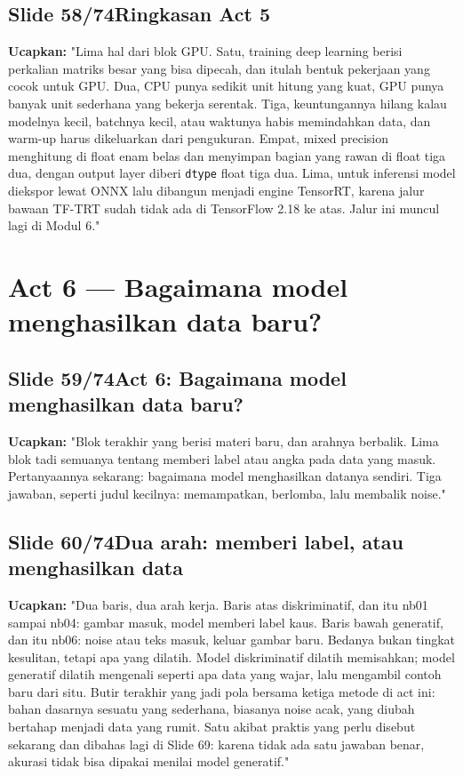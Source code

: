 \documentclass[11pt]{article}
\renewcommand{\framebox}[1]{\colorbox{acc!15}{\textcolor{acc}{\textbf{#1}}}}
\begin{document}
\subsection*{\framebox{Slide 58/74}\quad Ringkasan Act 5}
\textbf{Ucapkan:} "Lima hal dari blok GPU. Satu, training deep learning berisi perkalian matriks besar yang bisa dipecah, dan itulah bentuk pekerjaan yang cocok untuk GPU. Dua, CPU punya sedikit unit hitung yang kuat, GPU punya banyak unit sederhana yang bekerja serentak. Tiga, keuntungannya hilang kalau modelnya kecil, batchnya kecil, atau waktunya habis memindahkan data, dan warm-up harus dikeluarkan dari pengukuran. Empat, mixed precision menghitung di float enam belas dan menyimpan bagian yang rawan di float tiga dua, dengan output layer diberi \texttt{dtype} float tiga dua. Lima, untuk inferensi model diekspor lewat ONNX lalu dibangun menjadi engine TensorRT, karena jalur bawaan TF-TRT sudah tidak ada di TensorFlow 2.18 ke atas. Jalur ini muncul lagi di Modul 6."\\[2pt]

\section{Act 6 — Bagaimana model menghasilkan data baru?}

\subsection*{\framebox{Slide 59/74}\quad Act 6: Bagaimana model menghasilkan data baru?}
\textbf{Ucapkan:} "Blok terakhir yang berisi materi baru, dan arahnya berbalik. Lima blok tadi semuanya tentang memberi label atau angka pada data yang masuk. Pertanyaannya sekarang: bagaimana model menghasilkan datanya sendiri. Tiga jawaban, seperti judul kecilnya: memampatkan, berlomba, lalu membalik noise."\\[2pt]

\subsection*{\framebox{Slide 60/74}\quad Dua arah: memberi label, atau menghasilkan data}
\textbf{Ucapkan:} "Dua baris, dua arah kerja. Baris atas diskriminatif, dan itu nb01 sampai nb04: gambar masuk, model memberi label kaus. Baris bawah generatif, dan itu nb06: noise atau teks masuk, keluar gambar baru. Bedanya bukan tingkat kesulitan, tetapi apa yang dilatih. Model diskriminatif dilatih memisahkan; model generatif dilatih mengenali seperti apa data yang wajar, lalu mengambil contoh baru dari situ. Butir terakhir yang jadi pola bersama ketiga metode di act ini: bahan dasarnya sesuatu yang sederhana, biasanya noise acak, yang diubah bertahap menjadi data yang rumit. Satu akibat praktis yang perlu disebut sekarang dan dibahas lagi di Slide 69: karena tidak ada satu jawaban benar, akurasi tidak bisa dipakai menilai model generatif."\\[2pt]
\end{document}
